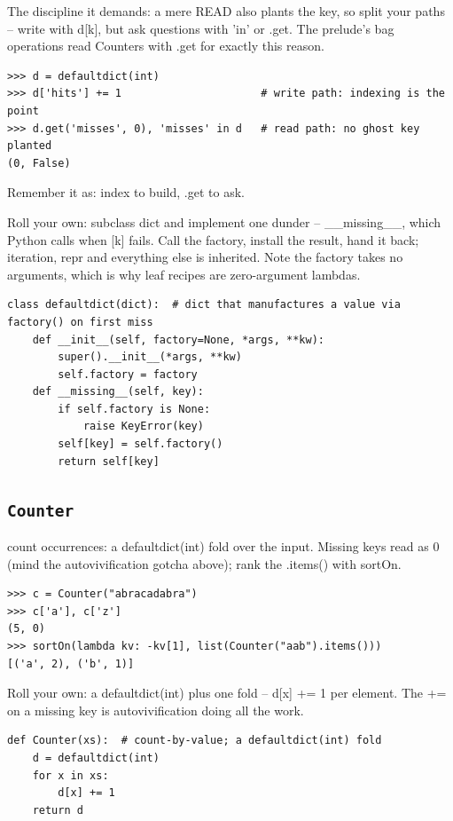 \documentclass[10pt,letterpaper]{book}
\begin{document}
The discipline it demands: a mere READ also plants the key, so split your paths -- write with d[k], but ask questions with 'in' or .get. The prelude's bag operations read Counters with .get for exactly this reason.

\begin{lstlisting}[style=ex]
>>> d = defaultdict(int)
>>> d['hits'] += 1                      # write path: indexing is the point
>>> d.get('misses', 0), 'misses' in d   # read path: no ghost key planted
(0, False)
\end{lstlisting}

Remember it as: index to build, .get to ask.


Roll your own: subclass dict and implement one dunder -- \_\_missing\_\_, which Python calls when [k] fails. Call the factory, install the result, hand it back; iteration, repr and everything else is inherited. Note the factory takes no arguments, which is why leaf recipes are zero-argument lambdas.

\begin{lstlisting}[style=ex]
class defaultdict(dict):  # dict that manufactures a value via factory() on first miss
    def __init__(self, factory=None, *args, **kw):
        super().__init__(*args, **kw)
        self.factory = factory
    def __missing__(self, key):
        if self.factory is None:
            raise KeyError(key)
        self[key] = self.factory()
        return self[key]
\end{lstlisting}

\subsection{\texttt{Counter}}\label{def:Counter}
count occurrences: a defaultdict(int) fold over the input. Missing keys read as 0 (mind the autovivification gotcha above); rank the .items() with sortOn.
\begin{lstlisting}[style=ex]
>>> c = Counter("abracadabra")
>>> c['a'], c['z']
(5, 0)
>>> sortOn(lambda kv: -kv[1], list(Counter("aab").items()))
[('a', 2), ('b', 1)]
\end{lstlisting}

Roll your own: a defaultdict(int) plus one fold -- d[x] += 1 per element. The += on a missing key is autovivification doing all the work.

\begin{lstlisting}[style=ex]
def Counter(xs):  # count-by-value; a defaultdict(int) fold
    d = defaultdict(int)
    for x in xs:
        d[x] += 1
    return d
\end{lstlisting}
\end{document}
